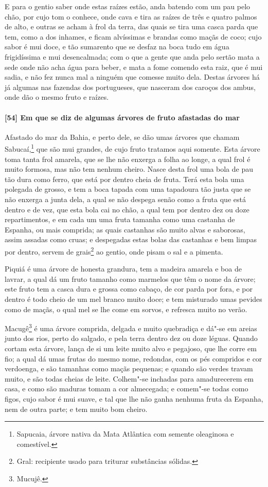 E para o gentio saber onde estas raízes estão, anda batendo com um pau pelo chão, por cujo
tom o conhece, onde cava e tira as raízes de três e quatro palmos de alto, e outras se
acham à frol da terra, das quais se tira uma casca parda que tem, como a dos inhames, e
ficam alvíssimas e brandas como maçãs de coco; cujo sabor é mui doce, e tão sumarento que
se desfaz na boca tudo em água frigidíssima e mui desencalmada; com o que a gente que anda
pelo sertão mata a sede onde não acha água para beber, e mata a fome comendo esta raiz,
que é mui sadia, e não fez nunca mal a ninguém que comesse muito dela. Destas árvores há
já algumas nas fazendas dos portugueses, que nasceram dos caroços dos ambus, onde dão o
mesmo fruto e raízes.

\paragraph{[54] Em que se diz de algumas árvores de fruto afastadas do mar}\quad
Afastado do mar da Bahia, e perto dele, se dão umas árvores que chamam Sabucaí,\footnote{
Sapucaia, árvore nativa da Mata Atlântica com semente oleaginosa e comestível.} que são
mui grandes, de cujo fruto tratamos aqui somente. Esta árvore toma tanta frol amarela, que
se lhe não enxerga a folha ao longe, a qual frol é muito formosa, mas não tem nenhum
cheiro. Nasce desta frol uma bola de pau tão dura como ferro, que está por dentro cheia de
fruta. Terá esta bola uma polegada de grosso, e tem a boca tapada com uma tapadoura tão
justa que se não enxerga a junta dela, a qual se não despega senão como a fruta que está
dentro e de vez, que esta bola cai no chão, a qual tem por dentro dez ou doze
repartimentos, e em cada um uma fruta tamanha como uma castanha de Espanha, ou mais
comprida; as quais castanhas são muito alvas e saborosas, assim assadas como cruas; e
despegadas estas bolas das castanhas e bem limpas por dentro, servem de grais\footnote{
Gral: recipiente usado para triturar substâncias sólidas.} ao gentio, onde pisam o sal e a
pimenta.

Piquiá é uma árvore de honesta grandura, tem a madeira amarela e boa de lavrar, a qual dá
um fruto tamanho como marmelos que têm o nome da árvore; este fruto tem a casca dura e
grossa como cabaço, de cor parda por fora, e por dentro é todo cheio de um mel branco
muito doce; e tem misturado umas pevides como de maçãs, o qual mel se lhe come em sorvos,
e refresca muito no verão.

Macugê\footnote{ Mucujê.} é uma árvore comprida, delgada e muito quebradiça e dá"-se em
areias junto dos rios, perto do salgado, e pela terra dentro dez ou doze léguas. Quando
cortam esta árvore, lança de si um leite muito alvo e pegajoso, que lhe corre em fio; a
qual dá umas frutas do mesmo nome, redondas, com os pés compridos e cor verdoenga, e são
tamanhas como maçãs pequenas; e quando são verdes travam muito, e são todas cheias de
leite. Colhem"-se inchadas para amadurecerem em casa, e como são maduras tomam a cor
almecegada; e comem"-se todas como figos, cujo sabor é mui suave, e tal que lhe não ganha
nenhuma fruta da Espanha, nem de outra parte; e tem muito bom cheiro.

